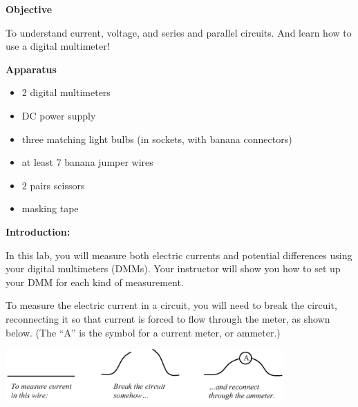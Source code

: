 \makelabheader %

\bigskip
\textbf{Objective}

To understand current, voltage, and series and parallel circuits.  And learn how to use a digital multimeter!

\bigskip
\textbf{Apparatus}

\begin{itemize}[nosep]
\item 2 digital multimeters 
\item DC power supply 
\item three matching light bulbs (in sockets, with banana connectors)
\item at least 7 banana jumper wires 
\item 2 pairs scissors
\item masking tape
\end{itemize}

\bigskip
\textbf{Introduction:}

In this lab, you will measure both electric currents and potential differences using your digital multimeters (DMMs).  Your instructor will show you how to set up your DMM for each kind of measurement.

To measure the electric current in a circuit, you will need to break the circuit, reconnecting it so that current is forced to flow through the meter, as shown below.  (The ``A'' is the symbol for a current meter, or ammeter.)

\begin{center}
\includegraphics[width=0.8\textwidth]{electric_circuits/how_to_measure_current.eps}
\end{center}
\vspace{-0.1in}

